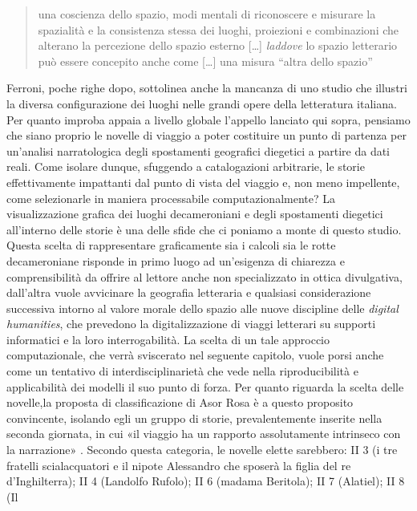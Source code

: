 \begin{quote}
una coscienza dello spazio, modi mentali di riconoscere e misurare la
spazialità e la consistenza stessa dei luoghi, proiezioni e combinazioni
che alterano la percezione dello spazio esterno {[}\ldots{}{]}
\emph{laddove} lo spazio letterario può essere concepito anche come
{[}\ldots{}{]} una misura ``altra dello spazio''

\autocite[p.~90]{ferroni2012}
\end{quote}

Ferroni, poche righe dopo, sottolinea anche la mancanza di uno studio
che illustri la diversa configurazione dei luoghi nelle grandi opere
della letteratura italiana. Per quanto improba appaia a livello globale
l'appello lanciato qui sopra, pensiamo che siano proprio le novelle di
viaggio a poter costituire un punto di partenza per un'analisi
narratologica degli spostamenti geografici diegetici a partire da dati
reali. Come isolare dunque, sfuggendo a catalogazioni arbitrarie, le
storie effettivamente impattanti dal punto di vista del viaggio e, non
meno impellente, come selezionarle in maniera processabile
computazionalmente? La visualizzazione grafica dei luoghi decameroniani
e degli spostamenti diegetici all'interno delle storie è una delle sfide
che ci poniamo a monte di questo studio. Questa scelta di rappresentare
graficamente sia i calcoli sia le rotte decameroniane risponde in primo
luogo ad un'esigenza di chiarezza e comprensibilità da offrire al
lettore anche non specializzato in ottica divulgativa, dall'altra vuole
avvicinare la geografia letteraria e qualsiasi considerazione successiva
intorno al valore morale dello spazio alle nuove discipline delle
\emph{digital humanities}, che prevedono la digitalizzazione di viaggi
letterari su supporti informatici e la loro interrogabilità. La scelta
di un tale approccio computazionale, che verrà sviscerato nel seguente
capitolo, vuole porsi anche come un tentativo di interdisciplinarietà
che vede nella riproducibilità e applicabilità dei modelli il suo punto
di forza. Per quanto riguarda la scelta delle novelle,la proposta di
classificazione di Asor Rosa è a questo proposito convincente, isolando
egli un gruppo di storie, prevalentemente inserite nella seconda
giornata, in cui «il viaggio ha un rapporto assolutamente intrinseco con
la narrazione» \autocite[p.~549]{asor1992}. Secondo questa categoria, le
novelle elette sarebbero: II 3 (i tre fratelli scialacquatori e il
nipote Alessandro che sposerà la figlia del re d'Inghilterra); II 4
(Landolfo Rufolo); II 6 (madama Beritola); II 7 (Alatiel); II 8 (Il

